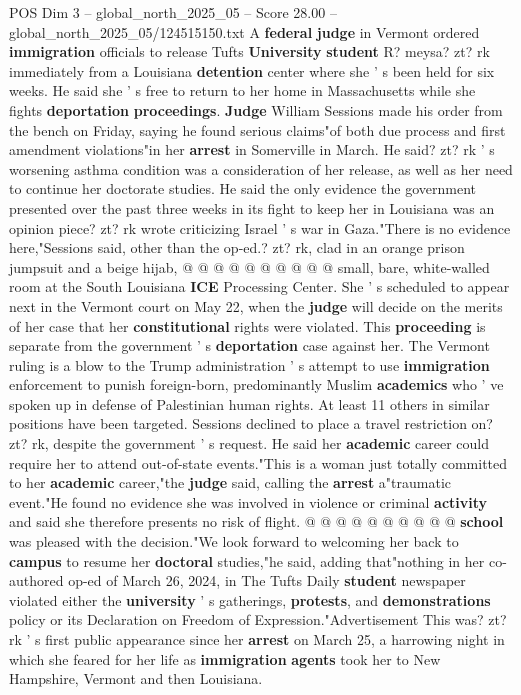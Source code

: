 \begin{textsample}{POS Dim 3 – global\_north\_2025\_05 – Score 28.00 – global\_north\_2025\_05/124515150.txt}  \label{ex:f3_pos_132}
A \textbf{federal} \textbf{judge} in Vermont ordered \textbf{immigration} officials to release Tufts \textbf{University} \textbf{student} R? meysa? zt? rk immediately from a Louisiana \textbf{detention} center where she ' s been held for six weeks.
He said she ' s free to return to her home in Massachusetts while she fights \textbf{deportation} \textbf{proceedings}. \textbf{Judge} William Sessions made his order from the bench on Friday, saying he found serious claims"of both due process and first amendment violations"in her \textbf{arrest} in Somerville in March.
He said? zt? rk ' s worsening asthma condition was a consideration of her release, as well as her need to continue her doctorate studies.
He said the only evidence the government presented over the past three weeks in its fight to keep her in Louisiana was an opinion piece? zt? rk wrote criticizing Israel ' s war in Gaza."There is no evidence here,"Sessions said, other than the op-ed.? zt? rk, clad in an orange prison jumpsuit and a beige hijab, @ @ @ @ @ @ @ @ @ @ small, bare, white-walled room at the South Louisiana \textbf{ICE} Processing Center.
She ' s scheduled to appear next in the Vermont court on May 22, when the \textbf{judge} will decide on the merits of her case that her \textbf{constitutional} rights were violated.
This \textbf{proceeding} is separate from the government ' s \textbf{deportation} case against her.
The Vermont ruling is a blow to the Trump administration ' s attempt to use \textbf{immigration} enforcement to punish foreign-born, predominantly Muslim \textbf{academics} who ' ve spoken up in defense of Palestinian human rights.
At least 11 others in similar positions have been targeted.
Sessions declined to place a travel restriction on? zt? rk, despite the government ' s request.
He said her \textbf{academic} career could require her to attend out-of-state events."This is a woman just totally committed to her \textbf{academic} career,"the \textbf{judge} said, calling the \textbf{arrest} a"traumatic event."He found no evidence she was involved in violence or criminal \textbf{activity} and said she therefore presents no risk of flight. @ @ @ @ @ @ @ @ @ @ \textbf{school} was pleased with the decision."We look forward to welcoming her back to \textbf{campus} to resume her \textbf{doctoral} studies,"he said, adding that"nothing in her co-authored op-ed of March 26, 2024, in The Tufts Daily \textbf{student} newspaper violated either the \textbf{university} ' s gatherings, \textbf{protests}, and \textbf{demonstrations} policy or its Declaration on Freedom of Expression."Advertisement This was? zt? rk ' s first public appearance since her \textbf{arrest} on March 25, a harrowing night in which she feared for her life as \textbf{immigration} \textbf{agents} took her to New Hampshire, Vermont and then Louisiana.

\end{textsample}
